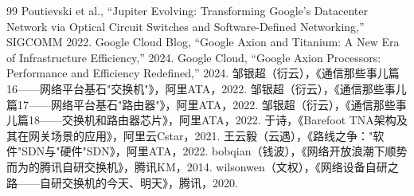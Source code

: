 \begin{thebibliography}{99}
 Poutievski et al., ``Jupiter Evolving: Transforming Google's Datacenter Network via Optical Circuit Switches and Software-Defined Networking,'' SIGCOMM 2022.
 Google Cloud Blog, ``Google Axion and Titanium: A New Era of Infrastructure Efficiency,'' 2024.
 Google Cloud, ``Google Axion Processors: Performance and Efficiency Redefined,'' 2024.
 邹银超（衍云），《通信那些事儿篇16——网络平台基石"交换机"》，阿里ATA，2022.
 邹银超（衍云），《通信那些事儿篇17——网络平台基石"路由器"》，阿里ATA，2022.
 邹银超（衍云），《通信那些事儿篇18——交换机和路由器芯片》，阿里ATA，2022.
 于诗，《Barefoot TNA架构及其在网关场景的应用》，阿里云Cstar，2021.
 王云毅（云遇），《路线之争："软件"SDN与"硬件"SDN》，阿里ATA，2022.
 bobqian（钱波），《网络开放浪潮下顺势而为的腾讯自研交换机》，腾讯KM，2014.
 wilsonwen（文权），《网络设备自研之路——自研交换机的今天、明天》，腾讯，2020.
\end{thebibliography}
